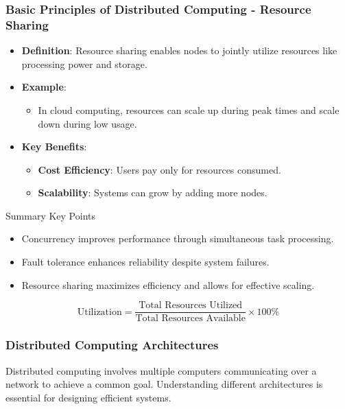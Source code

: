 \documentclass[aspectratio=169]{beamer}
\begin{document}
\begin{frame}[fragile]
    \frametitle{Basic Principles of Distributed Computing - Resource Sharing}
    \begin{itemize}
        \item \textbf{Definition}: Resource sharing enables nodes to jointly utilize resources like processing power and storage.
        \item \textbf{Example}:
        \begin{itemize}
            \item In cloud computing, resources can scale up during peak times and scale down during low usage.
        \end{itemize}
        \item \textbf{Key Benefits}:
        \begin{itemize}
            \item \textbf{Cost Efficiency}: Users pay only for resources consumed.
            \item \textbf{Scalability}: Systems can grow by adding more nodes.
        \end{itemize}
    \end{itemize}

    \begin{block}{Summary Key Points}
        \begin{itemize}
            \item Concurrency improves performance through simultaneous task processing.
            \item Fault tolerance enhances reliability despite system failures.
            \item Resource sharing maximizes efficiency and allows for effective scaling.
        \end{itemize}
    \end{block}

    \begin{equation}
        \text{Utilization} = \frac{\text{Total Resources Utilized}}{\text{Total Resources Available}} \times 100\%
    \end{equation}
\end{frame}

\begin{frame}[fragile]
    \frametitle{Distributed Computing Architectures}
    Distributed computing involves multiple computers communicating over a network to achieve a common goal. Understanding different architectures is essential for designing efficient systems. 
\end{frame}
\end{document}
